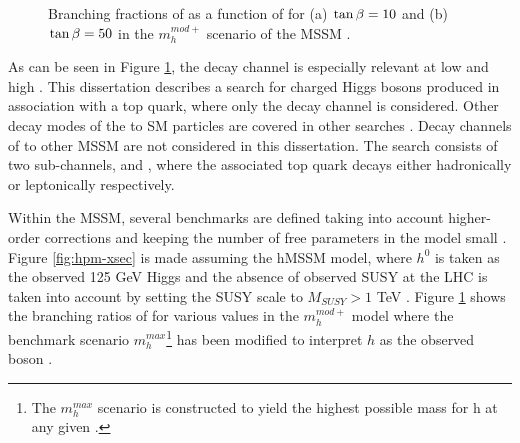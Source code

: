 	\begin{figure}[!ht]
		\centering
		\caption{\label{fig:hpm-br} Branching fractions of \Hpm as a function of \mHpm for (a) $\tan\beta = 10$ and (b) $\tan\beta = 50$ in the $m^{mod+}_{h}$ scenario of the \gls{MSSM} \cite{Higgs-Crosssections}. }
	\end{figure}
	As can be seen in Figure \ref{fig:hpm-br}, the \HpmLong decay channel is especially relevant at low \mHpm and high \tanb. This dissertation describes a search for charged Higgs bosons produced in association with a top quark, where only the \HpmLong decay channel is considered. Other decay modes of the \Hpm to \gls{SM} particles are covered in other searches \cites{MSSM-benchmarks}. Decay channels of \Hpm to other \gls{MSSM} are not considered in this dissertation. The search consists of two sub-channels, \taujets and \taulep, where the associated top quark decays either hadronically or leptonically respectively. 

	Within the \gls{MSSM}, several benchmarks are defined taking into account higher-order corrections and keeping the number of free parameters in the model small \cite{MSSM-benchmarks}. Figure \ref{fig:hpm-xsec} is made assuming the hMSSM model, where $h^0$ is taken as the observed 125 GeV Higgs and the absence of observed \gls{SUSY} at the LHC is taken into account by setting the \gls{SUSY} scale to $M_{SUSY}>1$ TeV \cite{hMSSM}. Figure \ref{fig:hpm-br} shows the branching ratios of \Hpm for various \tanb values in the $m^{mod+}_{h}$ model where the benchmark scenario $m^{max}_{h}$\footnote{The $m^{max}_{h}$ scenario is constructed to yield the highest possible mass for h at any given \tanb.} has been modified to interpret $h$ as the observed boson \cite{MSSM-benchmarks}.

